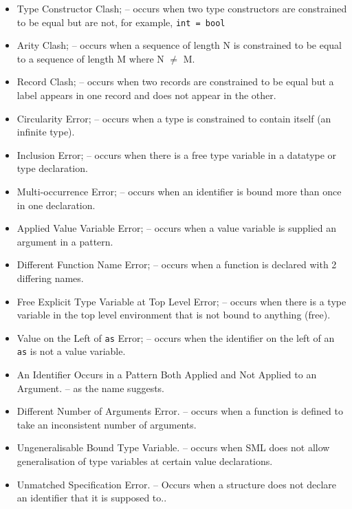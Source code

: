 \documentclass{report}
\begin{document}
\begin{itemize}

\item Type Constructor Clash; \subitem -- occurs
  when two type constructors are constrained to be equal but
  are not, for example, \texttt{int = bool}
\item Arity Clash; \subitem -- occurs when a sequence of length N is
  constrained to be equal to a sequence of length M where N $\neq$ M.
\item Record Clash; \subitem -- occurs when two records are
  constrained to be equal but a label appears in one record and does
  not appear in the other.
\item Circularity Error; \subitem -- occurs when a type is
  constrained to contain itself (an infinite type).
\item Inclusion Error; \subitem -- occurs when there is a free type
  variable in a datatype or type declaration.
\item Multi-occurrence Error; \subitem -- occurs when an identifier
  is bound more than once in one declaration.
\item Applied Value Variable Error; \subitem -- occurs when a value
  variable is supplied an argument in a pattern.
\item Different Function Name Error; \subitem -- occurs when a
  function is declared with 2 differing names.
\item Free Explicit Type Variable at Top Level Error; \subitem --
  occurs when there is a type variable in the top level environment
  that is not bound to anything (free).
\item Value on the Left of \texttt{as} Error; \subitem --
  occurs when the identifier on the left of an \texttt{as} is
  not a value variable.
\item An Identifier Occurs in a Pattern Both Applied and Not Applied to
  an Argument. \subitem -- as the name suggests.
\item Different Number of Arguments Error.  \subitem -- occurs when a
  function is defined to take an inconsistent number of arguments.
\item Ungeneralisable Bound Type Variable.  \subitem -- occurs when SML does
  not allow generalisation of type variables at certain value
  declarations.
\item Unmatched Specification Error. \subitem -- Occurs when a structure does not declare an identifier that it is supposed to..
\end{itemize}
\end{document}
